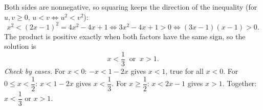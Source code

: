 Both sides are nonnegative, so squaring keeps the direction of the inequality (for $u,v\ge0$, $u<v\iff u^2<v^2$):
\[
x^2<(2x-1)^2=4x^2-4x+1\iff 3x^2-4x+1>0\iff(3x-1)(x-1)>0 .
\]
The product is positive exactly when both factors have the same sign, so the solution is
\[
\boxed{x<\dfrac{1}{3}\ \text{ or }\ x>1}.
\]
\emph{Check by cases.} For $x<0$: $-x<1-2x$ gives $x<1$, true for all $x<0$. For $0\le x<\dfrac{1}{2}$: $x<1-2x$ gives $x<\dfrac{1}{3}$. For $x\ge\dfrac{1}{2}$: $x<2x-1$ gives $x>1$. Together: $x<\dfrac{1}{3}$ or $x>1$.
